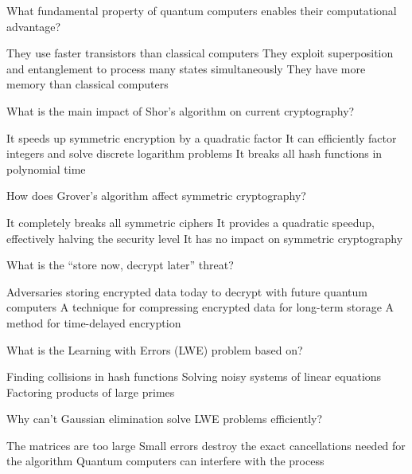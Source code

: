 \documentclass[10pt,a4paper,american]{exam}
\begin{document}
\begin{questions}
	\question What fundamental property of quantum computers enables their computational advantage?
	\begin{randomizechoices}
		\choice They use faster transistors than classical computers
		\CorrectChoice They exploit superposition and entanglement to process many states simultaneously
		\choice They have more memory than classical computers
	\end{randomizechoices}

	\question What is the main impact of Shor's algorithm on current cryptography?
	\begin{randomizechoices}
		\choice It speeds up symmetric encryption by a quadratic factor
		\CorrectChoice It can efficiently factor integers and solve discrete logarithm problems
		\choice It breaks all hash functions in polynomial time
	\end{randomizechoices}

	\question How does Grover's algorithm affect symmetric cryptography?
	\begin{randomizechoices}
		\choice It completely breaks all symmetric ciphers
		\CorrectChoice It provides a quadratic speedup, effectively halving the security level
		\choice It has no impact on symmetric cryptography
	\end{randomizechoices}

	\question What is the ``store now, decrypt later'' threat?
	\begin{randomizechoices}
		\CorrectChoice Adversaries storing encrypted data today to decrypt with future quantum computers
		\choice A technique for compressing encrypted data for long-term storage
		\choice A method for time-delayed encryption
	\end{randomizechoices}

	\question What is the Learning with Errors (LWE) problem based on?
	\begin{randomizechoices}
		\choice Finding collisions in hash functions
		\CorrectChoice Solving noisy systems of linear equations
		\choice Factoring products of large primes
	\end{randomizechoices}

	\question Why can't Gaussian elimination solve LWE problems efficiently?
	\begin{randomizechoices}
		\choice The matrices are too large
		\CorrectChoice Small errors destroy the exact cancellations needed for the algorithm
		\choice Quantum computers can interfere with the process
	\end{randomizechoices}


\end{questions}
\end{document}
